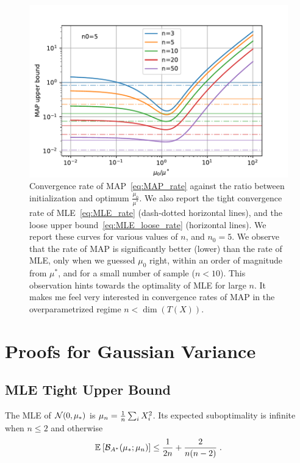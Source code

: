 \documentclass{article}
\newcommand*{\expect}[2][]{\ensuremath{\mathbb{E}_{#1} \left[ #2 \right] }} %
\newcommand{\logpart}{A}
\newcommand{\bregmanconj}{\cB_{\logpart^*}}
\begin{document}
\begin{figure}[ht]
	\centering
	\includegraphics[width=.7\textwidth]{figs/MAP_rates/MAP_rate_n0=5.pdf}
	\caption{
	Convergence rate of MAP~\eqref{eq:MAP_rate} 
	\label{fig:MAP_rate} against the ratio between initialization and optimum $ \frac{\mu_0}{\mu^*}$. 
	We also report the tight convergence rate of MLE~\eqref{eq:MLE_rate} (dash-dotted horizontal lines), and the loose upper bound~\eqref{eq:MLE_loose_rate} (horizontal lines). 
	We report these curves for various values of $n$, and $n_0=5$. 
	We observe that the rate of MAP is significantly better (lower) than the rate of MLE, only when we guessed $\mu_0$ right, within an order of magnitude from $\mu^*$, and for a small number of sample ($n<10$). 
	This observation hints towards the optimality of MLE for large $n$. 
	It makes me feel very interested in convergence rates of MAP in the overparametrized regime $n<\dim(T(X))$.
	}
\end{figure}


\section{Proofs for Gaussian Variance}
\subsection{MLE Tight Upper Bound}
	\begin{theorem}
	The MLE of ${\mathcal N}(0,\mu_*)$ is $\mu_n = \frac{1}{n} \sum_i X_i^2 $.
	Its expected suboptimality is infinite when $n\leq 2$ and otherwise
	\begin{align}
		 \expect{\bregmanconj( \mu_*; \mu_n) }
			\leq \inv{2n} +\frac{2}{n(n-2)} \; .
	\end{align}
	\end{theorem}
	
\end{document}
